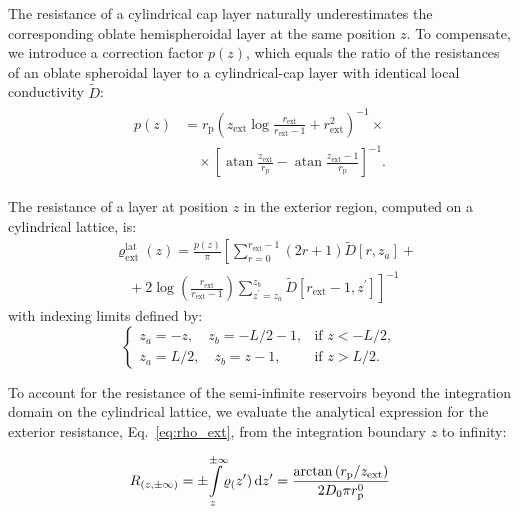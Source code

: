 \documentclass[10pt, a4paper, twocolumn]{article}
\begin{document}
The resistance of a cylindrical cap layer naturally underestimates the corresponding oblate hemispheroidal layer at the same position $z$.
To compensate, we introduce a correction factor $p(z)$, which equals the ratio of the resistances of an oblate spheroidal layer to a cylindrical-cap layer with identical local conductivity $\tilde{D}$:
\begin{gather}
    \label{eq:prefactor}
    \begin{aligned}
        p(z) &= r_{\text{p}} \left(z_{\text{ext}} \log{\frac{r_{\text{ext}}}{r_{\text{ext}} - 1}} + r_{\text{ext}}^{2}\right)^{-1} \times \\[4pt]
        &\quad\times\left[\operatorname{atan}{\frac{z_{\text{ext}}}{r_{\text{p}}}} - \operatorname{atan}{\frac{z_{\text{ext}} - 1}{r_{\text{p}}}}\right]^{-1}.
    \end{aligned}
\end{gather}

The resistance of a layer at position $z$ in the exterior region, computed on a cylindrical lattice, is:
\begin{equation}
    \begin{aligned}
        &\varrho_{\text{ext}}^{\text{lat}}(z) = 
        \frac{p(z)}{\pi}\left[
        \sum_{r=0}^{r_{\text{ext}}-1}(2r+1)\tilde{D}[r,z_a]\right. + \\[4pt]
        &\quad+\left. 2 \log\left(\frac{r_{\text{ext}}}{r_{\text{ext}}\!-\! 1}\right)\sum_{z^{\prime}=z_{a}}^{z_{b}}\tilde{D}[r_{\text{ext}}\!-\!1,z^{\prime}]
        \right]^{-1}
    \end{aligned}
\end{equation}
with indexing limits defined by:
\begin{equation*}
    \begin{cases}
        z_{a} = -z,\quad z_{b} = -L/2-1,&\text{if } z < -L/2,\\[4pt]
        z_{a} = L/2,\quad z_{b} = z-1,&\text{if } z > L/2.
    \end{cases}
\end{equation*}


To account for the resistance of the semi-infinite reservoirs beyond the integration domain on the cylindrical lattice, we evaluate the analytical expression for the exterior resistance, Eq.~\ref{eq:rho_ext}, from the integration boundary $z$ to infinity:

\begin{eqnarray}
    \label{eq:r_reservoir}
    R_{(z, \pm\infty)} = \pm\!\! \int\displaylimits_{z}^{\pm\infty}\!\! \varrho_(z') \, \text{d}z' = \frac{\arctan\left({r_{\text{p}}}/{z_{\text{ext}}} \right)}{2 D_0 \pi r_{\text{p}}^{0}}
\end{eqnarray}
\end{document}
